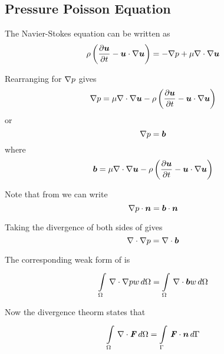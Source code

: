 \subsection{Pressure Poisson Equation}

The Navier-Stokes equation can be written as
\begin{equation}
  \rho\pbrac{\delby{\vectr{u}}{t}-\dotprod{\vectr{u}}{\gradient{}{\vectr{u}}}}=-\grad{p}+\mu\divergence{}{\gradient{}{\vectr{u}}}
  \label{eqn:NavierStokes}
\end{equation}

Rearranging for $\nabla{p}$ gives
\begin{equation}
  \grad{p}=\mu\divergence{}{\gradient{}{\vectr{u}}}-\rho\pbrac{\delby{\vectr{u}}{t}-\dotprod{\vectr{u}}{\gradient{}{\vectr{u}}}}  
\end{equation}
or
\begin{equation}
  \gradient{}{p}=\vectr{b}
  \label{eqn:NavierStokesPressureForm}
\end{equation}
where
\begin{equation}
  \vectr{b}=\mu\divergence{}{\gradient{}{\vectr{u}}}-\rho\pbrac{\delby{\vectr{u}}{t}-\dotprod{\vectr{u}}{\gradient{}{\vectr{u}}}}
\end{equation}

Note that from  we can write
\begin{equation} 
  \dotprod{\gradient{}{p}}{\normal}=\dotprod{\vectr{b}}{\normal}
  \label{eqn:NavierStokesPressureFormNormal}
\end{equation}

Taking the divergence of both sides of  gives
\begin{equation}
  \divergence{}{\gradient{}{p}}=\divergence{}{\vectr{b}}
  \label{eqn:PressurePoisson}
\end{equation}

The corresponding weak form of  is
\begin{equation}
  \gint{\Omega}{}{\divergence{}{\gradient{}{p}}w}{\Omega}=\gint{\Omega}{}{\divergence{}{\vectr{b}}w}{\Omega}
  \label{eqn:PressurePoissonWeakForm}
\end{equation}

Now the divergence theorm states that
\begin{equation}
  \gint{\Omega}{}{\divergence{}{\tensor{F}}}{\Omega}=\gint{\Gamma}{}{\dotprod{\tensor{F}}{\normal}}{\Gamma}
  \label{eqn:DivergenceTheorm}
\end{equation}

